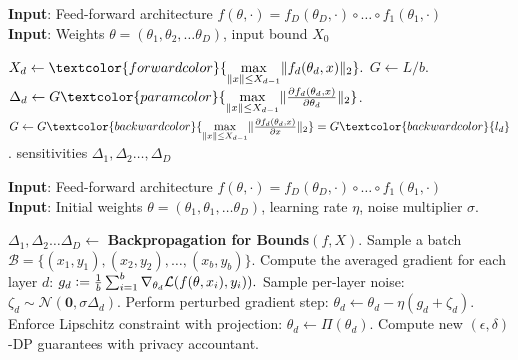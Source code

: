     \begin{algorithm}%
    \caption{\textbf{Backpropagation for Bounds}$(f, X)$}
    \label{alg:gnbc}
    \textbf{Input}: Feed-forward architecture $f(\theta,\cdot)=f_{D}(\theta_{D},\cdot)\circ \ldots \circ f_1(\theta_1,\cdot)$\\
    \textbf{Input}: Weights $\theta=(\theta_1,\theta_2,\ldots \theta_{D})$, input bound $X_0$%
    \begin{algorithmic}[1] %
        \State $X_d \gets \textcolor{forwardcolor}{\underset{\|x\|\leq X_{d-1}}{\max}\|f_d(\theta_d,x)\|_2}.$  \label{alg:gnbc:anb}
    \EndFor
    \State $G\gets L/b.$ 
        \State $\Delta_d \gets G \textcolor{paramcolor}{\underset{\|x\|\leq X_{d-1}}{\max}\|\Jac{f_d(\theta_d,x)}{\theta_d}\|_2}$.  \label{alg:gnbc:gnb}
        \State $G\gets G \textcolor{backwardcolor}{\underset{\|x\|\leq X_{d-1}}{\max}\|\Jac{f_d(\theta_d,x)}{x}\|_2} = G \textcolor{backwardcolor}{l_d}$.  \label{alg:gnbc:lip}
    \EndFor
    \State \Return sensitivities $\Delta_1,\Delta_2\ldots ,\Delta_{D}$
    \end{algorithmic}
    \end{algorithm}

    \begin{algorithm}%
    \caption{\textbf{Clipless DP-SGD} with \textbf{per-layer} sensitivity accounting}
    \label{alg:noclipDP-SGDlocal}
    \textbf{Input}: Feed-forward architecture $f(\theta,\cdot)=f_{D}(\theta_{D},\cdot)\circ \ldots \circ f_1(\theta_1,\cdot)$\\
    \textbf{Input}: Initial weights $\theta=(\theta_1,\theta_1,\ldots \theta_D)$, learning rate $\eta$, noise multiplier $\sigma$.%
    \begin{algorithmic}[1] %
    \Repeat
        \State $\Delta_1,\Delta_2\ldots \Delta_{D}\gets $ \textbf{Backpropagation for Bounds}$(f, X)$.
        \State Sample a batch $\mathcal{B}=\{(x_1, y_1), (x_2, y_2), \ldots, (x_b, y_b)\}$.
        \State Compute the averaged gradient for each layer $d$: 
            $g_{d}\vcentcolon= \frac{1}{b} \sum_{i=1}^b \nabla_{\theta_{d}} \mathcal{L} (f(\theta, x_i),y_i)).$
        \State Sample per-layer noise: $\zeta_d \sim \mathcal{N}(\bm 0,\sigma \Delta_d)$. 
        \State Perform perturbed gradient step:
            $\theta_{d}\gets \theta_{d}-\eta (g_{d} + \zeta_d)$.
        \State Enforce Lipschitz constraint with projection:
            $\theta_{d}\gets \Pi(\theta_{d})$.
        \State Compute new $(\epsilon,\delta)$-DP guarantees with privacy accountant.
    \end{algorithmic}
    \end{algorithm}

